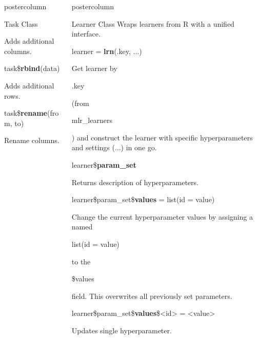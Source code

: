 \documentclass{beamer}
\newlength{\columnheight} %
\newcommand{\codeinline}[1]{\begin{codeboxinline}#1\end{codeboxinline}}
\begin{document}
\begin{frame}[fragile]{}
\begin{columns}
\begin{column}{.245\textwidth}
\begin{beamercolorbox}[center]{postercolumn}
\begin{minipage}{.98\textwidth}
{\begin{myblock}{Task Class}
\begin{codebox}
							\end{codebox}
							Adds additional columns.
							\\
							\begin{codebox}
								task\$\textbf{rbind}(data)
							\end{codebox}
							Adds additional rows.
							\\
							\begin{codebox}
								task\$\textbf{rename}(from, to)
							\end{codebox}
							Rename columns.
						\end{myblock}
					\vfill}
				\end{minipage}
			\end{beamercolorbox}
		\end{column}
		\begin{column}{.245\textwidth}
			\begin{beamercolorbox}[center]{postercolumn}
				\begin{minipage}{.98\textwidth}
					\parbox[t][\columnheight]{\textwidth}{
						\begin{myblock}{Learner Class}
							Wraps learners from R with a unified interface.
							\\
							\begin{codebox}
								learner = \textbf{lrn}(.key, ...)
							\end{codebox}
							Get learner by \codeinline{.key} (from \codeinline{mlr\_learners}) 
							and construct the learner with specific hyperparameters and settings (...) in one go.
							\\
							\begin{codebox}
								learner\$\textbf{param\_set}
							\end{codebox}
							Returns description of hyperparameters.	
							\\
							\begin{codebox}
								learner\$param\_set\$\textbf{values} = list(id = value)
							\end{codebox}
							Change the current hyperparameter values by assigning a named \codeinline{list(id = value)} to the \codeinline{\$values} field.
							This overwrites all previously set parameters.	
							\\
							\begin{codebox}
								learner\$param\_set\$\textbf{values}\$<id> = <value>
							\end{codebox}
							Updates single hyperparameter.
							\vspace{1em}

\end{myblock}}
\end{minipage}
\end{beamercolorbox}
\end{column}
\end{columns}
\end{frame}
\end{document}
